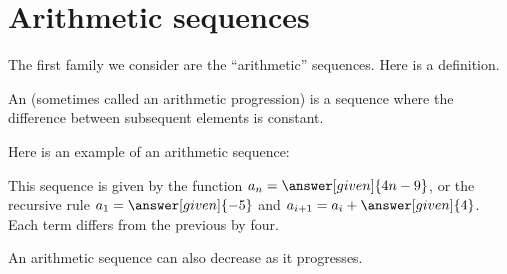 \documentclass{ximera}
\begin{document}
\section{Arithmetic sequences}


The first family we consider are the ``arithmetic'' sequences.  Here
is a definition.


\begin{definition}
  An  (sometimes called an arithmetic
  progression) is a sequence where the
  difference between subsequent elements is constant.
\end{definition}


\begin{example}
  Here is an example of an arithmetic sequence:
  \begin{image}
  \end{image}
  This sequence is given by the function $a_n=\answer[given]{4n-9}$,
  or the recursive rule $a_1 = \answer[given]{-5}$ and $a_{i+1} = a_i
  + \answer[given]{4}$. Each term differs from the previous by four.
\end{example}

An arithmetic sequence can also decrease as it progresses.
\end{document}
